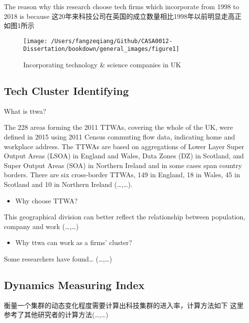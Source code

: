 \documentclass[
  12pt,
  oneside]{book}
\providecommand{\tightlist}{%
  \setlength{\itemsep}{0pt}\setlength{\parskip}{0pt}}
\begin{document}
The reason why this research choose tech firms which incorporate from 1998 to 2018 is because
这20年来科技公司在英国的成立数量相比1998年以前明显走高正如图1所示

\begin{figure}
\texttt{[image: /Users/fangzeqiang/Github/CASA0012-Dissertation/bookdown/general\_images/figure1]} \caption{Incorporating technology & science companies in UK}\label{fig:fig-1}
\end{figure}

\hypertarget{tech-cluster-identifying}{%
\subsection{Tech Cluster Identifying}\label{tech-cluster-identifying}}

What is ttwa?

The 228 areas forming the 2011 TTWAs, covering the whole of the UK, were defined in 2015 using 2011 Census commuting flow data, indicating home and workplace address. The TTWAs are based on aggregations of Lower Layer Super Output Areas (LSOA) in England and Wales, Data Zones (DZ) in Scotland, and Super Output Areas (SOA) in Northern Ireland and in some cases span country borders. There are six cross-border TTWAs, 149 in England, 18 in Wales, 45 in Scotland and 10 in Northern Ireland (\ldots,\ldots).

\begin{itemize}
\tightlist
\item
  Why choose TTWA?
\end{itemize}

This geographical division can better reflect the relationship between population, company and work (\ldots,\ldots)

\begin{itemize}
\tightlist
\item
  Why ttwa can work as a firms' cluster?
\end{itemize}

Some researchers have found\ldots{} (\ldots,\ldots)

\hypertarget{dynamics-measuring-index}{%
\subsection{Dynamics Measuring Index}\label{dynamics-measuring-index}}

衡量一个集群的动态变化程度需要计算出科技集群的进入率，计算方法如下
这里参考了其他研究者的计算方法(\ldots,\ldots)
\end{document}
